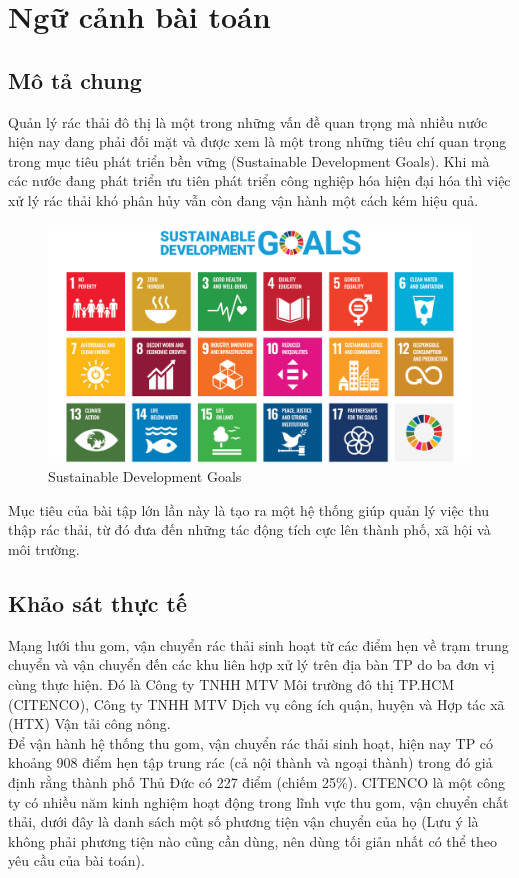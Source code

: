 

\section{Ngữ cảnh bài toán}
    \subsection{Mô tả chung}
        \quad Quản lý rác thải đô thị là một trong những vấn đề quan trọng mà nhiều nước hiện nay đang phải đối mặt và được xem là một trong những tiêu chí quan trọng trong mục tiêu phát triển bền vững (Sustainable Development Goals). Khi mà các nước đang phát triển ưu tiên phát triển công nghiệp hóa hiện đại hóa thì việc xử lý rác thải khó phân hủy vẫn còn đang vận hành một cách kém hiệu quả.\\

        \begin{figure}[h]
            \centering
            \includegraphics[width=1\linewidth]{imgs/SDG.jpg}
            \caption{Sustainable Development Goals}
        \end{figure}

        \quad Mục tiêu của bài tập lớn lần này là tạo ra một hệ thống giúp quản lý việc thu thập rác thải, từ đó đưa đến những tác động tích cực lên thành phố, xã hội và môi trường.
    \subsection{Khảo sát thực tế}
        \quad Mạng lưới thu gom, vận chuyển rác thải sinh hoạt từ các điểm hẹn về trạm trung chuyển và vận chuyển đến các khu liên hợp xử lý trên địa bàn TP do ba đơn vị cùng thực hiện. Đó là Công ty TNHH MTV Môi trường đô thị TP.HCM (CITENCO), Công ty TNHH MTV Dịch vụ công ích quận, huyện và Hợp tác xã (HTX) Vận tải công nông. \\
        \quad Để vận hành hệ thống thu gom, vận chuyển rác thải sinh hoạt, hiện nay TP có khoảng 908 điểm hẹn tập trung rác (cả nội thành và ngoại thành) trong đó giả định rằng thành phố Thủ Đức có 227 điểm (chiếm 25\%). CITENCO là một công ty có nhiều năm kinh nghiệm hoạt động trong lĩnh vực thu gom, vận chuyển chất thải, dưới đây là danh sách một số phương tiện vận chuyển của họ (Lưu ý là không phải phương tiện nào cũng cần dùng, nên dùng tối giản nhất có thể theo yêu cầu của bài toán).

